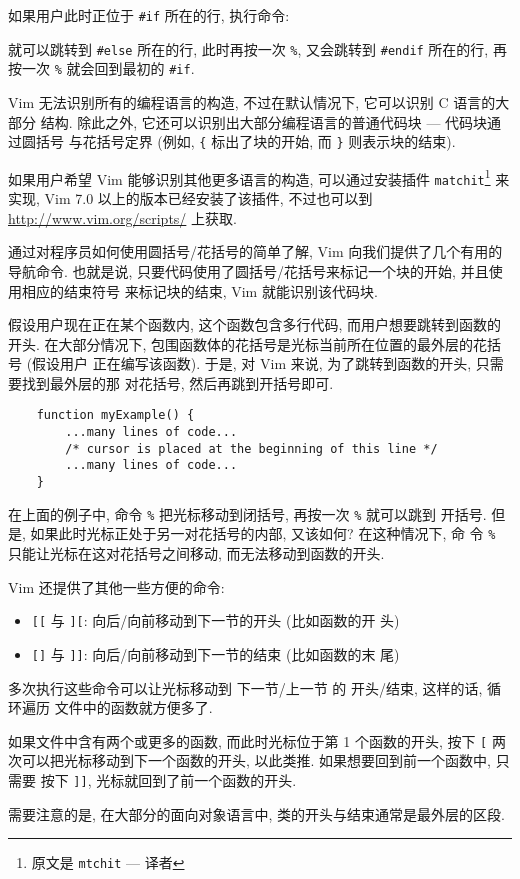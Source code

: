 如果用户此时正位于 \texttt{\#if} 所在的行, 执行命令:
\begin{vimcmd}
%
\end{vimcmd}
就可以跳转到 \texttt{\#else} 所在的行, 此时再按一次 \verb'%', 又会跳转到
\texttt{\#endif} 所在的行, 再按一次 \verb'%' 就会回到最初的 \texttt{\#if}.

Vim 无法识别所有的编程语言的构造, 不过在默认情况下, 它可以识别 C 语言的大部分
结构. 除此之外, 它还可以识别出大部分编程语言的普通代码块 --- 代码块通过圆括号
与花括号定界 (例如, \verb'{' 标出了块的开始, 而 \verb'}' 则表示块的结束).
\begin{warning}
    如果用户希望 Vim 能够识别其他更多语言的构造, 可以通过安装插件
    \texttt{matchit}\footnote{原文是 \texttt{mtchit} --- 译者} 来实现, Vim 7.0
    以上的版本已经安装了该插件, 不过也可以到 \url{http://www.vim.org/scripts/}
    上获取.
\end{warning}

通过对程序员如何使用圆括号/花括号的简单了解, Vim 向我们提供了几个有用的导航命令.
也就是说, 只要代码使用了圆括号/花括号来标记一个块的开始, 并且使用相应的结束符号
来标记块的结束, Vim 就能识别该代码块.

假设用户现在正在某个函数内, 这个函数包含多行代码, 而用户想要跳转到函数的开头.
在大部分情况下, 包围函数体的花括号是光标当前所在位置的最外层的花括号 (假设用户
正在编写该函数). 于是, 对 Vim 来说, 为了跳转到函数的开头, 只需要找到最外层的那
对花括号, 然后再跳到开括号即可.
\begin{verbatim}
    function myExample() {
        ...many lines of code...
        /* cursor is placed at the beginning of this line */
        ...many lines of code...
    }
\end{verbatim}
在上面的例子中, 命令 \verb'%' 把光标移动到闭括号, 再按一次 \verb'%' 就可以跳到
开括号. 但是, 如果此时光标正处于另一对花括号的内部, 又该如何? 在这种情况下, 命
令 \verb'%' 只能让光标在这对花括号之间移动, 而无法移动到函数的开头.

Vim 还提供了其他一些方便的命令:
\begin{itemize}
    \item \texttt{[[} 与  \texttt{][}: 向后/向前移动到下一节的开头 (比如函数的开
        头)
    \item \texttt{[]} 与  \texttt{]]}: 向后/向前移动到下一节的结束 (比如函数的末
        尾)
\end{itemize}
多次执行这些命令可以让光标移动到 下一节/上一节 的 开头/结束, 这样的话, 循环遍历
文件中的函数就方便多了.

如果文件中含有两个或更多的函数, 而此时光标位于第 1 个函数的开头, 按下 \texttt{[}
两次可以把光标移动到下一个函数的开头, 以此类推. 如果想要回到前一个函数中, 只需要
按下 \texttt{]]}, 光标就回到了前一个函数的开头.
\begin{warning}
    需要注意的是, 在大部分的面向对象语言中, 类的开头与结束通常是最外层的区段.
\end{warning}

